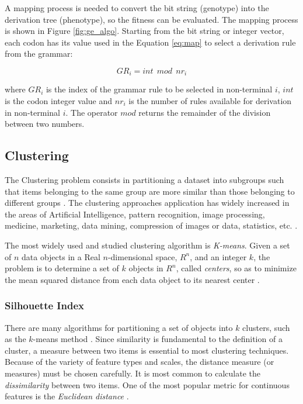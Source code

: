 \documentclass[journal]{IEEEtran}
\begin{document}
	A mapping process is needed to convert the bit string (genotype) into the derivation tree (phenotype), so the fitness can be evaluated. The mapping process is shown in Figure \ref{fig:ge_algo}. Starting from the bit string or integer vector, each codon has its value used in the Equation \ref{eq:map} to select a derivation rule from the grammar:
	
	\begin{equation}\label{eq:map}
	GR_i = int~~mod~~nr_i
	\end{equation}
	
	where $GR_i$ is the index of the grammar rule to be selected in non-terminal $i$, $int$ is the codon integer value and $nr_i$ is the number of rules available for derivation in non-terminal $i$. The operator $mod$ returns the remainder of the division between two numbers.
	
	
	\subsection{Clustering}
	
	The Clustering problem consists in partitioning a dataset into subgroups such that items belonging to the same group are more similar than those belonging to different groups \cite{boric2007genetic} \cite{ahalya2015data}. The clustering approaches application has widely increased in the areas of Artificial Intelligence, pattern recognition, image processing, medicine, marketing, data mining, compression of images or data, statistics, etc. \cite{ahalya2015data}.
	
	The most widely used and studied clustering algorithm is \textit{K-means}. Given a set of $n$ data objects in a Real $n$-dimensional space, $R^n$, and an integer $k$, the problem is to determine a set of $k$ objects in $R^n$, called \textit{centers}, so as to minimize the mean squared distance from each data object to its nearest center \cite{kanungo2002efficient}.
	
	
	\subsubsection{Silhouette Index}
	\label{sec:sillhouetteIndex}
	
	There are many algorithms for partitioning a set of objects into $k$ clusters, such as the $k$-means method \cite{kanungo2002efficient}. Since similarity is fundamental to the definition of a cluster, a measure between two items is essential to most clustering techniques. Because of the variety of feature types and scales, the distance measure (or measures) must be chosen carefully. It is most common to calculate the \textit{dissimilarity} between two items. One of the most popular metric for continuous features is the \textit{Euclidean distance} \cite{jain1988algorithms}.
	
\end{document}
